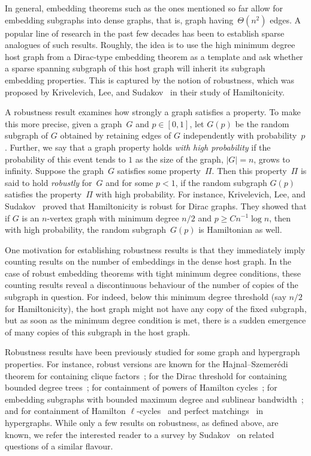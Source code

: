 \documentclass[final]{article}
\theoremstyle{definition}
\begin{document}
In general, embedding theorems such as the ones mentioned so far allow
for embedding subgraphs into dense graphs, that is, graph
having~$\Theta(n^2)$ edges. A popular line of research in the past few
decades has been to establish sparse analogues of such results. Roughly, the idea is to use the high minimum degree host
graph from a Dirac-type embedding theorem as a template and ask whether a sparse
spanning subgraph of this host graph will inherit its
subgraph embedding properties.
This is captured by the notion of robustness, which was proposed
by Krivelevich, Lee, and Sudakov~\cite{robust_hamiltonicity} in their
study of Hamiltonicity. 

A robustness result examines
how strongly a graph satisfies a property. To make this more precise, given a
graph~$G$ and $p\in[0,1]$, let $G(p)$ be the random subgraph
of $G$ obtained by retaining edges of $G$ independently with
probability~$p$. Further, we say that a graph property holds \emph{with high probability} if the probability of this event tends to $1$ as the size of the graph, $|G| = n$, grows to infinity.  
Suppose the graph~$G$ satisfies some
property~$\Pi$. Then this property~$\Pi$ is said to hold
\emph{robustly} for~$G$ and for some $p < 1$, if the random subgraph $G(p)$ satisfies the
property~$\Pi$ with high probability. For instance,
Krivelevich, Lee, and Sudakov~\cite{robust_hamiltonicity} proved that
Hamiltonicity is robust for Dirac graphs. They showed that if $G$ is
an $n$-vertex graph with minimum degree $n/2$ and
$p\ge Cn^{-1}\log n$, then with high probability, the random subgraph~$G(p)$ is 
Hamiltonian as well.

One motivation for establishing robustness results is that they immediately imply counting results on the number of embeddings in the dense host graph.
In the case of robust embedding theorems with
tight minimum degree conditions, these counting results reveal a discontinuous behaviour of the number of copies of the
subgraph in question. For indeed, below this minimum degree
threshold (say $n/2$ for Hamiltonicity), the host graph might not have
any copy of the fixed subgraph, but as soon as the minimum degree
condition is met, there is a sudden emergence of many copies of
this subgraph in the host graph.

Robustness results have been previously studied for some graph and hypergraph
properties. For instance, robust versions are known for the
Hajnal--Szemer\'edi theorem for containing clique
factors~\cite{robust_corradi_hajnal, toolkit_robust_thresholds}; for
the Dirac threshold for containing bounded degree
trees~\cite{bastide2024randomembeddingsboundeddegree, toolkit_robust_thresholds}; for containment of powers of Hamilton cycles~\cite{joos2024robusthamiltonicity}; for embedding subgraphs with bounded maximum degree and sublinear bandwidth~\cite{sparse_blowup}; and for containment of
Hamilton $\ell$-cycles~\cite{Alp_robustness_spread} and perfect
matchings~\cite{robust_pmatch_hyperG, toolkit_robust_thresholds} in
hypergraphs. While only a few results on robustness, as defined
above, are known, we refer the interested reader to a survey by
Sudakov~\cite{Robust_survey} on related questions of a similar
flavour.
\end{document}
